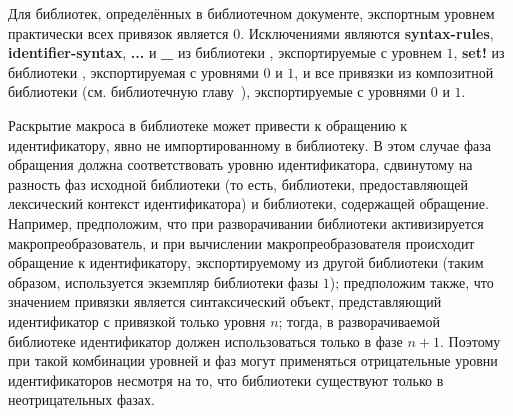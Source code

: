 Для библиотек, определённых в библиотечном документе, экспортным уровнем практически всех
привязок является $0$. Исключениями являются {\cf\bfseries syntax-rules}, {\cf\bfseries
  identifier-syntax}, {\cf\bfseries ...} и {\cf\bfseries \_} из библиотеки
\textbf{}, экспортируемые с уровнем $1$, {\cf\bfseries set!} из библиотеки
\textbf{}, экспортируемая с уровнями $0$ и $1$, и все привязки из композитной
библиотеки \textbf{\thersixlibrary{}} (см. библиотечную
главу~), экспортируемые с уровнями $0$ и $1$.

Раскрытие макроса в библиотеке может привести к обращению к идентификатору, явно не
импортированному в библиотеку. В этом случае фаза обращения должна соответствовать уровню
идентификатора, сдвинутому на разность фаз исходной библиотеки (то есть, библиотеки,
предоставляющей лексический контекст идентификатора) и библиотеки, содержащей
обращение. Например, предположим, что при разворачивании библиотеки активизируется
макропреобразователь, и при вычислении макропреобразователя происходит обращение к
идентификатору, экспортируемому из другой библиотеки (таким образом, используется экземпляр
библиотеки фазы $1$); предположим также, что значением привязки является синтаксический объект,
представляющий идентификатор с привязкой только уровня $n$; тогда, в разворачиваемой библиотеке
идентификатор должен использоваться только в фазе $n+1$. Поэтому при такой комбинации уровней и
фаз могут применяться отрицательные уровни идентификаторов несмотря на то, что библиотеки
существуют только в неотрицательных фазах.

